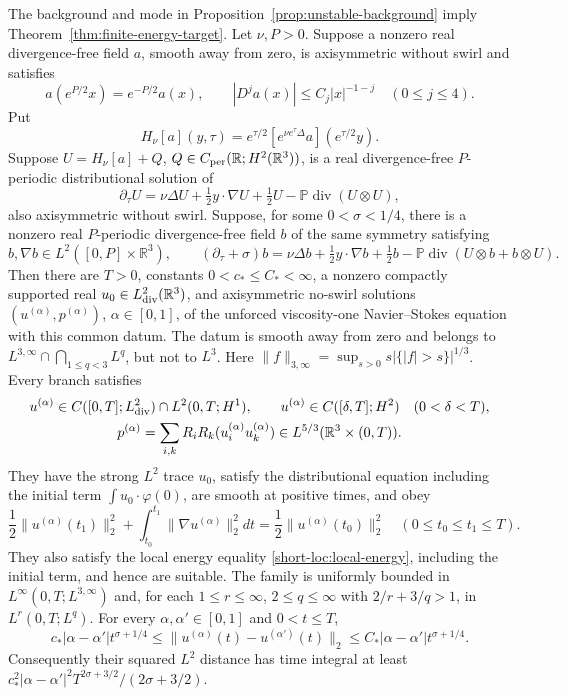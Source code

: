 \begin{proposition}\label{short-loc:reduction}
\ifdefined\CompleteCandidate
The background and mode in Proposition~\ref{prop:unstable-background}
imply Theorem~\ref{thm:finite-energy-target}.
\else
Let $\nu,P>0$. Suppose a nonzero real divergence-free field $a$, smooth away
from zero, is axisymmetric without swirl and satisfies
\[
 a(e^{P/2}x)=e^{-P/2}a(x),\qquad
 |D^ja(x)|\le C_j|x|^{-1-j}\quad(0\le j\le4).
\]
Put
\[
 H_\nu[a](y,\tau)=e^{\tau/2}
       [e^{\nu e^\tau\Delta}a](e^{\tau/2}y).
\]
Suppose $U=H_\nu[a]+Q$, $Q\in C_{\rm per}(\mathbb R;H^2(\mathbb R^3))$,
is a real divergence-free $P$-periodic distributional solution of
\[
 \partial_\tau U=\nu\Delta U+\tfrac12y\cdot\nabla U+\tfrac12U
       -\mathbb P\operatorname{div}(U\otimes U),
\]
also axisymmetric without swirl. Suppose, for some $0<\sigma<1/4$,
there is a nonzero real $P$-periodic divergence-free field $b$ of the same
symmetry satisfying
\[
 b,\nabla b\in L^2([0,P]\times\mathbb R^3),\qquad
 (\partial_\tau+\sigma)b
 =\nu\Delta b+\tfrac12y\cdot\nabla b+\tfrac12b
   -\mathbb P\operatorname{div}(U\otimes b+b\otimes U).
\]
Then there are $T>0$, constants $0<c_*\le C_*<\infty$, a nonzero
compactly supported real $u_0\in L^2_{\rm div}(\mathbb R^3)$, and
axisymmetric no-swirl solutions $(u^{(\alpha)},p^{(\alpha)})$,
$\alpha\in[0,1]$, of the unforced viscosity-one Navier--Stokes equation
with this common datum. The datum is smooth away from zero and belongs
to $L^{3,\infty}\cap\bigcap_{1\le q<3}L^q$, but not to $L^3$.
Here $\|f\|_{3,\infty}=\sup_{s>0}s|\{|f|>s\}|^{1/3}$.
Every branch satisfies
\[
 \begin{gathered}
 u^{(\alpha)}\in C([0,T];L^2_{\rm div})\cap L^2(0,T;H^1),\qquad
 u^{(\alpha)}\in C([\delta,T];H^2)\quad(0<\delta<T),\\
 p^{(\alpha)}=\sum_{i,k}R_iR_k(u^{(\alpha)}_iu^{(\alpha)}_k)
       \in L^{5/3}(\mathbb R^3\times(0,T)).
 \end{gathered}
\]
They have the strong $L^2$ trace $u_0$, satisfy the distributional
equation including the initial term $\int u_0\cdot\varphi(0)$,
are smooth at positive times, and obey
\[
 \frac12\|u^{(\alpha)}(t_1)\|_2^2+
 \int_{t_0}^{t_1}\|\nabla u^{(\alpha)}\|_2^2dt
 =\frac12\|u^{(\alpha)}(t_0)\|_2^2
 \quad(0\le t_0\le t_1\le T).
\]
They also satisfy the local energy equality
\eqref{short-loc:local-energy}, including the initial term, and hence
are suitable. The family is uniformly bounded in
$L^\infty(0,T;L^{3,\infty})$ and, for each $1\le r\le\infty$,
$2\le q\le\infty$ with $2/r+3/q>1$, in $L^r(0,T;L^q)$.
For every $\alpha,\alpha'\in[0,1]$ and $0<t\le T$,
\[
 c_*|\alpha-\alpha'|t^{\sigma+1/4}
 \le\|u^{(\alpha)}(t)-u^{(\alpha')}(t)\|_2
 \le C_*|\alpha-\alpha'|t^{\sigma+1/4}.
\]
Consequently their squared $L^2$ distance has time integral at least
$c_*^2|\alpha-\alpha'|^2T^{2\sigma+3/2}/(2\sigma+3/2)$.
\fi
\end{proposition}

